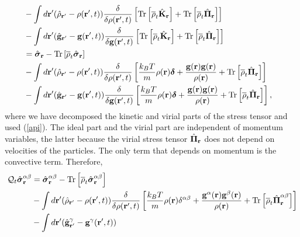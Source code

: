 \documentclass[b5paper,openright,10pt]{book}
\begin{document}
\begin{appendices}
\begin{align}
\nonumber\\
&-\int d{\bf r}'(\hat{\rho}_{{\bf r}'}-\rho({\bf r}',t))
\frac{\delta}{\delta \rho({\bf r}',t)}
\left[{\rm Tr}\left[\overline{\rho}_{t} \hat{\bf K}_{{\bf r}}\right]+{\rm Tr}\left[\overline{\rho}_{t} \hat{\boldsymbol{\Pi}}_{{\bf r}}\right]\right]
\nonumber\\
&-\int d{\bf r}'(\hat{\bf g}_{{\bf r}'}-{\bf g}({\bf r}',t))
\frac{\delta}{\delta {\bf g}({\bf r}',t)}
\left[{\rm Tr}\left[\overline{\rho}_{t} \hat{\bf K}_{{\bf r}}\right]+{\rm Tr}\left[\overline{\rho}_{t} \hat{\boldsymbol{\Pi}}_{{\bf r}}\right]\right]
\nonumber\\
&=\hat{\boldsymbol{\sigma}}_{{\bf r}}- {\rm Tr}\left[\overline{\rho}_{t} \hat{\boldsymbol{\sigma}}_{{\bf r}}\right]
\nonumber\\
&-\int d{\bf r}'(\hat{\rho}_{{\bf r}'}-\rho({\bf r}',t))
\frac{\delta}{\delta \rho({\bf r}',t)}
\left[
 \frac{k_BT}{m}\rho({\bf r})\boldsymbol{\delta}
+\frac{{\bf g}({\bf r}){\bf g}({\bf r})}{\rho({\bf r})}
+{\rm Tr}\left[\overline{\rho}_{t} \hat{\boldsymbol{\Pi}}_{{\bf r}}\right]\right]
\nonumber\\
&-\int d{\bf r}'(\hat{\bf g}_{{\bf r}'}-{\bf g}({\bf r}',t))
\frac{\delta}{\delta {\bf g}({\bf r}',t)}
\left[
 \frac{k_BT}{m}\rho({\bf r})\boldsymbol{\delta}
+\frac{{\bf g}({\bf r}){\bf g}({\bf r})}{\rho({\bf r})}
+{\rm Tr}\left[\overline{\rho}_{t} \hat{\boldsymbol{\Pi}}_{{\bf r}}\right]\right],
\label{QS}
\end{align}
where we  have decomposed the kinetic  and virial parts of  the stress
tensor and used  (\ref{api}).  The ideal part and the  virial part are
independent  of  momentum variables,  the  latter  because the  virial
stress  tensor $  \hat{\boldsymbol{\Pi}}_{\bf r}$  does not  depend on
velocities of the particles. The only term that depends on momentum is
the convective term. Therefore,
\begin{align}
  {\cal Q}_t\hat{\boldsymbol{\sigma}}^{\alpha\beta}_{{\bf r}}&=
\hat{\boldsymbol{\sigma}}^{\alpha\beta}_{{\bf r}}-{\rm Tr}\left[\overline{\rho}_t\hat{\boldsymbol{\sigma}}^{\alpha\beta}_{{\bf r}}\right]
\nonumber\\
&-\int d{\bf r}'(\hat{\rho}_{{\bf r}'}-\rho({\bf r}',t))
\frac{\delta}{\delta \rho({\bf r}',t)}
\left[
 \frac{k_BT}{m}\rho({\bf r})\delta^{\alpha\beta}
+\frac{{\bf g}^\alpha({\bf r}){\bf g}^\beta({\bf r})}{\rho({\bf r})}
+{\rm Tr}\left[\overline{\rho}_{t} \hat{\boldsymbol{\Pi}}^{\alpha\beta}_{{\bf r}}\right]\right]
\nonumber\\
&-\int d{\bf r}'(\hat{\bf g}^\gamma_{{\bf r}'}-{\bf g}^\gamma({\bf r}',t))

\end{align}
\end{appendices}
\end{document}
